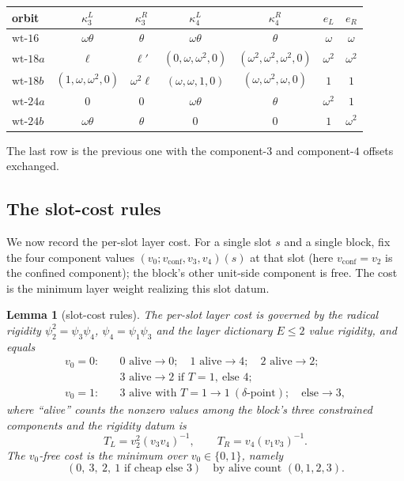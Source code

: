 \documentclass[11pt]{article}
\newcommand{\slab}{\ell}                          %
\theoremstyle{plain}
\newtheorem{lemma}{Lemma}[section]
\theoremstyle{definition}
\theoremstyle{remark}
\begin{document}
\begin{center}
\setlength{\tabcolsep}{5pt}
\begin{tabular}{lcccccc}
\toprule
orbit & $\kappa_3^L$ & $\kappa_3^R$ & $\kappa_4^L$ & $\kappa_4^R$ & $e_L$ & $e_R$\\
\midrule
$\text{wt-}16$  & $\omega\theta$ & $\theta$ & $\omega\theta$ & $\theta$ & $\omega$ & $\omega$\\
$\text{wt-}18a$ & $\slab$ & $\slab'$ & $(0,\omega,\omega^2,0)$ & $(\omega^2,\omega^2,\omega^2,0)$ & $\omega^2$ & $\omega^2$\\
$\text{wt-}18b$ & $(1,\omega,\omega^2,0)$ & $\omega^2\slab$ & $(\omega,\omega,1,0)$ & $(\omega,\omega^2,\omega,0)$ & $1$ & $1$\\
$\text{wt-}24a$ & $0$ & $0$ & $\omega\theta$ & $\theta$ & $\omega^2$ & $1$\\
$\text{wt-}24b$ & $\omega\theta$ & $\theta$ & $0$ & $0$ & $1$ & $\omega^2$\\
\bottomrule
\end{tabular}
\end{center}

\noindent The last row is the previous one with the component-$3$ and
component-$4$ offsets exchanged.

\subsection{The slot-cost rules}\label{ssec:slotcost}

We now record the per-slot layer cost. For a single slot $s$ and a single block,
fix the four component values $(v_0;v_{\mathrm{conf}},v_3,v_4)(s)$ at that slot
(here $v_{\mathrm{conf}}=v_2$ is the confined component); the block's other
unit-side component is free. The cost is the minimum layer weight realizing this
slot datum.

\begin{lemma}[slot-cost rules]\label{lem:slotcost}
The per-slot layer cost is governed by the radical rigidity
$\psi_2^2=\psi_3\psi_4$, $\psi_4=\psi_1\psi_3$ and the layer dictionary
$E\le 2$ value rigidity, and equals
\[
\begin{aligned}
  v_0=0:\quad & \text{$0$ alive}\to 0;\quad \text{$1$ alive}\to 4;\quad
    \text{$2$ alive}\to 2;\\
  & \text{$3$ alive}\to 2 \text{ if } T=1,\ \text{else } 4;\\
  v_0=1:\quad & \text{$3$ alive with $T=1$}\to 1\ (\text{$\delta$-point});\quad
    \text{else}\to 3,
\end{aligned}
\]
where ``alive'' counts the nonzero values among the block's three constrained
components and the rigidity datum is
\[
  T_L=v_2^2(v_3v_4)^{-1},\qquad T_R=v_4(v_1v_3)^{-1}.
\]
The $v_0$-free cost is the minimum over $v_0\in\{0,1\}$, namely
\[
  (0,\ 3,\ 2,\ 1\text{ if cheap else }3)\quad\text{by alive count }(0,1,2,3).
\]
\end{lemma}
\end{document}
